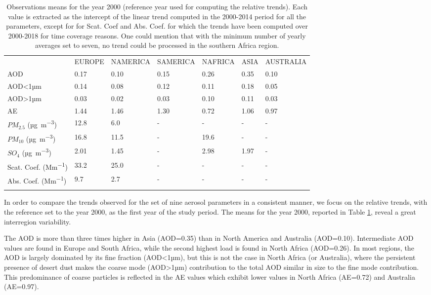 \documentclass[journal abbreviation, manuscript]{copernicus}
\begin{document}
\begin{table}
 \begin{tabular}{lllllll}
  \tophline
                     & EUROPE & NAMERICA & SAMERICA & NAFRICA & ASIA & AUSTRALIA \\
  \middlehline
  AOD                & 0.17   & 0.10     & 0.15     & 0.26    & 0.35 & 0.10      \\
  AOD<1µm            & 0.14   & 0.08     & 0.12     & 0.11    & 0.18 & 0.05      \\
  AOD>1µm            & 0.03   & 0.02     & 0.03     & 0.10    & 0.11 & 0.03      \\
  AE                 & 1.44   & 1.46     & 1.30     & 0.72    & 1.06 & 0.97      \\
  $PM_{2.5}$ (\unit{µg.m^{-3}})     & 12.8   & 6.0      & -        & -       & -    & -         \\
  $PM_{10}$ (\unit{µg.m^{-3}})      & 16.8   & 11.5     & -        & 19.6    & -    & -         \\
  $SO_{4}$ (\unit{µg.m^{-3}})       & 2.01   & 1.45     & -        & 2.98    & 1.97 & -         \\
  Scat. Coef. (\unit{Mm^{-1}}) & 33.2   & 25.0     & -        & -       & -    & -         \\
  Abs. Coef. (\unit{Mm^{-1}})  & 9.7    & 2.7      & -        & -       & -    & -         \\
  \bottomhline
 \end{tabular}

 \caption{Observations means for the year 2000 (reference year used for computing the relative trends). Each value is extracted as the intercept of the linear trend computed in the 2000-2014 period for all the parameters, except for for Scat. Coef and Abs. Coef. for which the trends have been computed over 2000-2018 for time coverage reasons. One could mention that with the minimum number of yearly averages set to seven, no trend could be processed in the southern Africa region.}
 \label{table:obs_2000mean}
\end{table}

In order to compare the trends observed for the set of nine aerosol parameters in a consistent manner, we focus on the relative trends, with the reference set to the year 2000, as the first year of the study period. The means for the year 2000, reported in Table \ref{table:obs_2000mean}, reveal a great interregion variability.

The AOD is more than three times higher in Asia (AOD=0.35) than in North America and Australia (AOD=0.10). Intermediate AOD values are found in Europe and South Africa, while the second highest load is found in North Africa (AOD=0.26). In most regions, the AOD is largely dominated by its fine fraction (AOD<1µm), but this is not the case in North Africa (or Australia), where the persistent presence of desert dust makes the coarse mode (AOD>1µm) contribution to the total AOD similar in size to the fine mode contribution. This predominance of coarse particles is reflected in the AE values which exhibit lower values in North Africa (AE=0.72) and Australia (AE=0.97).
\end{document}
